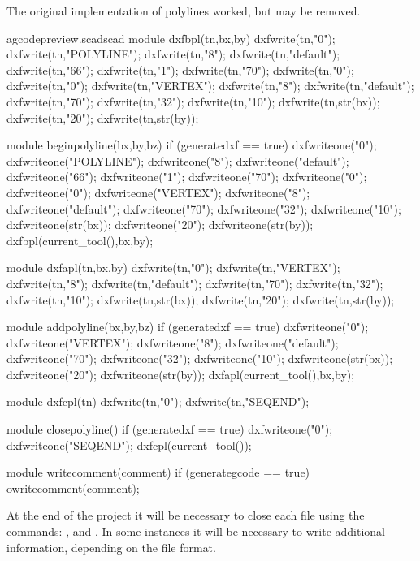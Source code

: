 \documentclass{ltxdoc}
\begin{document}
The original implementation of polylines worked, but may be removed.
 
\lstset{firstnumber=\thegcpscad}
\begin{writecode}{a}{gcodepreview.scad}{scad}
module dxfbpl(tn,bx,by) {
    dxfwrite(tn,"0");
    dxfwrite(tn,"POLYLINE");
    dxfwrite(tn,"8");
    dxfwrite(tn,"default");
    dxfwrite(tn,"66");
    dxfwrite(tn,"1");
    dxfwrite(tn,"70");
    dxfwrite(tn,"0");
    dxfwrite(tn,"0");
    dxfwrite(tn,"VERTEX");
    dxfwrite(tn,"8");
    dxfwrite(tn,"default");
    dxfwrite(tn,"70");
    dxfwrite(tn,"32");
    dxfwrite(tn,"10");
    dxfwrite(tn,str(bx));
    dxfwrite(tn,"20");
    dxfwrite(tn,str(by));
}

module beginpolyline(bx,by,bz) {
if (generatedxf == true) {
    dxfwriteone("0");
    dxfwriteone("POLYLINE");
    dxfwriteone("8");
    dxfwriteone("default");
    dxfwriteone("66");
    dxfwriteone("1");
    dxfwriteone("70");
    dxfwriteone("0");
    dxfwriteone("0");
    dxfwriteone("VERTEX");
    dxfwriteone("8");
    dxfwriteone("default");
    dxfwriteone("70");
    dxfwriteone("32");
    dxfwriteone("10");
    dxfwriteone(str(bx));
    dxfwriteone("20");
    dxfwriteone(str(by));
    dxfbpl(current_tool(),bx,by);}
}

module dxfapl(tn,bx,by) {
    dxfwrite(tn,"0");
    dxfwrite(tn,"VERTEX");
    dxfwrite(tn,"8");
    dxfwrite(tn,"default");
    dxfwrite(tn,"70");
    dxfwrite(tn,"32");
    dxfwrite(tn,"10");
    dxfwrite(tn,str(bx));
    dxfwrite(tn,"20");
    dxfwrite(tn,str(by));
}

module addpolyline(bx,by,bz) {
if (generatedxf == true) {
    dxfwriteone("0");
    dxfwriteone("VERTEX");
    dxfwriteone("8");
    dxfwriteone("default");
    dxfwriteone("70");
    dxfwriteone("32");
    dxfwriteone("10");
    dxfwriteone(str(bx));
    dxfwriteone("20");
    dxfwriteone(str(by));
    dxfapl(current_tool(),bx,by);
    }
}

module dxfcpl(tn) {
    dxfwrite(tn,"0");
    dxfwrite(tn,"SEQEND");
}

module closepolyline() {
  if (generatedxf == true) {
    dxfwriteone("0");
    dxfwriteone("SEQEND");
    dxfcpl(current_tool());
  }
}

module writecomment(comment) {
  if (generategcode == true) {
    owritecomment(comment);
  }
}

\end{writecode}
\addtocounter{gcpscad}{92}
 
At the end of the project it will be necessary to close each file using the commands: 
, and
. %
In some instances it will be necessary to write additional information,
depending on the file format.
 
\end{document}
